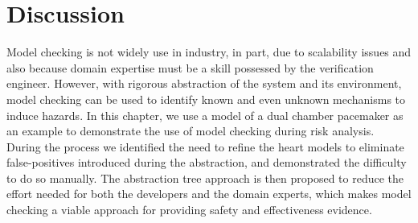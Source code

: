 \section{Discussion}
Model checking is not widely use in industry, in part, due to scalability issues and also because domain expertise must be a skill possessed by the verification engineer. However, with rigorous abstraction of the system and its environment, model checking can be used to identify 
known and even unknown mechanisms to induce hazards. In this chapter, we use a model of a dual chamber pacemaker as an example to demonstrate the use of model checking during risk analysis. During the process we identified the need to refine the heart models to eliminate false-positives introduced during the abstraction, and demonstrated the difficulty to do so manually. The abstraction tree approach is then proposed to reduce the effort needed for both the developers and the domain experts, which makes model checking a viable approach for providing safety and effectiveness evidence. 
